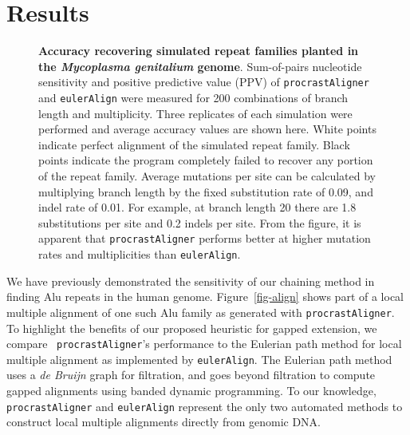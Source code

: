 \documentclass{llncs}
\begin{document}
\section{Results}
\begin{figure}[t]
\centering {}
\caption{\textbf{Accuracy recovering simulated repeat families planted in the
\textit{Mycoplasma genitalium} genome}.  Sum-of-pairs nucleotide
sensitivity and positive predictive value (PPV) of \texttt{procrastAligner} 
and \texttt{eulerAlign} were measured for 200
combinations of branch length and multiplicity.  Three replicates of
each simulation were performed and average accuracy values are shown
here.  White points indicate perfect alignment of the simulated repeat
family.  Black points indicate the program completely failed to
recover any portion of the repeat family.  Average mutations per site can be
calculated by multiplying branch length by the fixed substitution rate
of 0.09, and indel rate of 0.01.  For example, at branch length 20
there are 1.8 substitutions per site and 0.2 indels per site.  From
the figure, it is apparent that \texttt{procrastAligner} performs better
at higher mutation rates and multiplicities than \texttt{eulerAlign}.}
\label{fig-results}\vspace{-0.2cm}
\end{figure}

We have previously demonstrated the sensitivity of our chaining method
in finding Alu repeats in the human
genome\cite{ref-procrast}. Figure~\ref{fig-align} shows part of a
local multiple alignment of one such Alu family as generated with
\texttt{procrastAligner}. To highlight the benefits of our proposed
heuristic for gapped extension, we compare ~\texttt{procrastAligner}'s
performance to the Eulerian path method for local multiple alignment
as implemented by \texttt{eulerAlign}\cite{ref-related1}. The Eulerian
path method uses a \textit{de Bruijn} graph for filtration, and goes
beyond filtration to compute gapped alignments using banded dynamic
programming.  To our knowledge, \texttt{procrastAligner} and
\texttt{eulerAlign} represent the only two automated methods to
construct local multiple alignments directly from genomic DNA.
\end{document}

